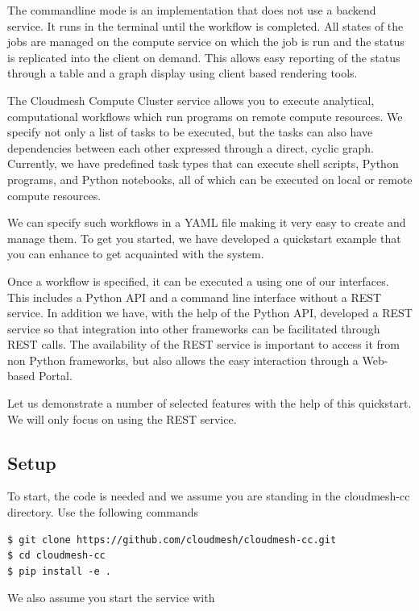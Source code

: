 The commandline mode is an implementation that does not use a
backend service. It runs in the terminal until the workflow is
completed. All states of the jobs are managed on the compute service on
which the job is run and the status is replicated into the client on
demand. This allows easy reporting of the status through a table and a
graph display using client based rendering tools. 


The Cloudmesh Compute Cluster service allows you to execute analytical,
computational workflows which run programs on remote compute resources.
We specify not only a list of tasks to be executed, but the tasks can
also have dependencies between each other expressed through a direct,
cyclic graph. Currently, we have predefined task types that can execute
shell scripts, Python programs, and Python notebooks, all of which can
be executed on local or remote compute resources.


We can specify such workflows in a YAML file making it very easy to
create and manage them. To get you started, we have developed a
quickstart example that you can enhance to get acquainted with the
system.

Once a workflow is specified, it can be executed a using one of our
interfaces. This includes a Python API and a command line interface
without a REST service. In addition we have, with the help of the Python
API, developed a REST service so that integration into other frameworks
can be facilitated through REST calls. The availability of the REST
service is important to access it from non Python frameworks, but also
allows the easy interaction through a Web-based Portal.

Let us demonstrate a number of selected features with the help of this
quickstart. We will only focus on using the REST service.

\subsection{Setup}\label{setup}

To start, the code is needed and we assume you are standing in the
cloudmesh-cc directory. Use the following commands

\smallskip
\begin{verbatim}
$ git clone https://github.com/cloudmesh/cloudmesh-cc.git
$ cd cloudmesh-cc
$ pip install -e .
\end{verbatim}
\smallskip

We also assume you start the service with

